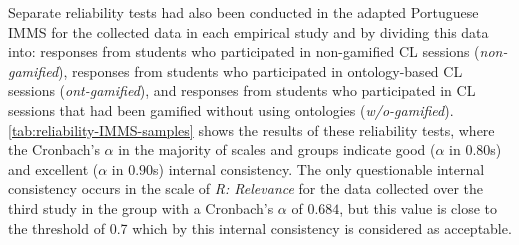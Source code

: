 Separate reliability tests had also been conducted in the adapted Portuguese IMMS for the collected data in each empirical study and by dividing this data into: responses from students who participated in non-gamified CL sessions (\emph{non-gamified}), responses from students who participated in ontology-based CL sessions (\emph{ont-gamified}), and responses from students who participated in CL sessions that had been gamified without using ontologies (\emph{w/o-gamified}). \autoref{tab:reliability-IMMS-samples} shows the results of these reliability tests, where the Cronbach's $\alpha$ in the majority of scales and groups indicate good ($\alpha$ in $0.80$s) and excellent ($\alpha$ in $0.90$s) internal consistency. The only questionable internal consistency occurs in the scale of \emph{R: Relevance} for the data collected over the third study in the  group with a Cronbach's $\alpha$ of $0.684$, but this value is close to the threshold of 0.7 which by this internal consistency is considered as acceptable.





